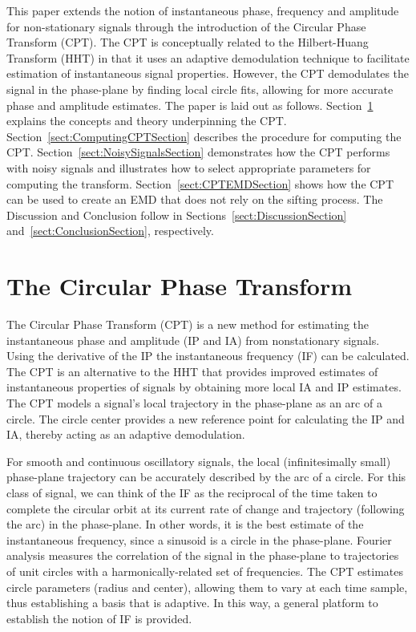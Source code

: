 \documentclass[a4paper]{IEEEtran}
\begin{document}
This paper extends the notion of instantaneous phase, frequency and amplitude for non-stationary signals through the introduction of the Circular Phase Transform (CPT). The CPT is conceptually related to the Hilbert-Huang Transform (HHT) in that it uses an adaptive demodulation technique to facilitate estimation of instantaneous signal properties. However, the CPT demodulates the signal in the phase-plane by finding local circle fits, allowing for more accurate phase and amplitude estimates. The paper is laid out as follows. Section~\ref{sect:CPTDescriptionSection} explains the concepts and theory underpinning the CPT. Section~\ref{sect:ComputingCPTSection} describes the procedure for computing the CPT. Section~\ref{sect:NoisySignalsSection} demonstrates how the CPT performs with noisy signals and illustrates how to select appropriate parameters for computing the transform. Section~\ref{sect:CPTEMDSection} shows how the CPT can be used to create an EMD that does not rely on the sifting process. %
The Discussion and Conclusion follow in Sections~\ref{sect:DiscussionSection} and~\ref{sect:ConclusionSection}, respectively. 

\section{The Circular Phase Transform}\label{sect:CPTDescriptionSection}
The Circular Phase Transform (CPT) is a new method for estimating the instantaneous phase and amplitude (IP and IA) from nonstationary signals. Using the derivative of the IP the instantaneous frequency (IF) can be calculated. The CPT is an alternative to the HHT that provides improved estimates of instantaneous properties of signals by obtaining more local IA and IP estimates. The CPT models a signal's local trajectory in the phase-plane as an arc of a circle. The circle center provides a new reference point for calculating the IP and IA, thereby acting as an adaptive demodulation.

For smooth and continuous oscillatory signals, the local (infinitesimally small) phase-plane trajectory can be accurately described by the arc of a circle. For this class of signal, we can think of the IF as the reciprocal of the time taken to complete the circular orbit at its current rate of change and trajectory (following the arc) in the phase-plane. In other words, it is the best estimate of the instantaneous frequency, since a sinusoid is a circle in the phase-plane. Fourier analysis measures the correlation of the signal in the phase-plane to trajectories of unit circles with a harmonically-related set of frequencies. The CPT estimates circle parameters (radius and center), allowing them to vary at each time sample, thus establishing a basis that is adaptive. In this way, a general platform to establish the notion of IF is provided.
\end{document}
